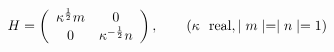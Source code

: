 \begin{equation}
H= \left(
\begin{array}{cc}
\kappa^{\frac{1}{2}} m & 0 \\
0  & \kappa^{-\frac{1}{2}} n
\end{array}
\right),~~~~~~(\kappa~~{\rm real}, \mid m \mid=\mid n \mid=1)
\end{equation}

